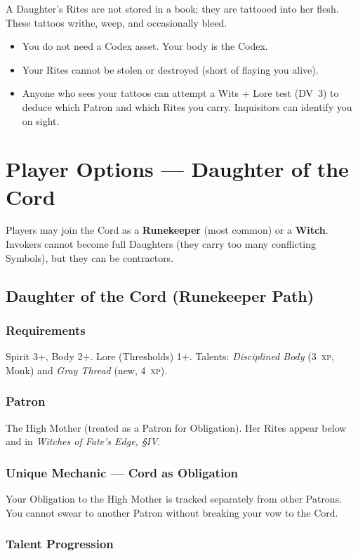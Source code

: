 \documentclass[10pt,twoside]{book}
\newcommand{\dv}[1]{\textsc{DV}~#1}
\newcommand{\xp}[1]{#1~\textsc{xp}}
\begin{document}
A Daughter's Rites are not stored in a book; they are tattooed into her flesh. These tattoos writhe, weep, and occasionally bleed.
\begin{itemize}
\item You do not need a Codex asset. Your body is the Codex.
\item Your Rites cannot be stolen or destroyed (short of flaying you alive).
\item Anyone who sees your tattoos can attempt a Wits + Lore test (\dv{3}) to deduce which Patron and which Rites you carry. Inquisitors can identify you on sight.
\end{itemize}

\chapter{Player Options --- Daughter of the Cord}

Players may join the Cord as a \textbf{Runekeeper} (most common) or a \textbf{Witch}. Invokers cannot become full Daughters (they carry too many conflicting Symbols), but they can be contractors.

\section{Daughter of the Cord (Runekeeper Path)}

\subsection*{Requirements}
Spirit 3+, Body 2+. Lore (Thresholds) 1+. Talents: \textit{Disciplined Body} (\xp{3}, Monk) and \textit{Gray Thread} (new, \xp{4}).

\subsection*{Patron}
The High Mother (treated as a Patron for Obligation). Her Rites appear below and in \textit{Witches of Fate's Edge, §IV}.

\subsection*{Unique Mechanic --- Cord as Obligation}
Your Obligation to the High Mother is tracked separately from other Patrons. You cannot swear to another Patron without breaking your vow to the Cord.

\subsection*{Talent Progression}
\end{document}
